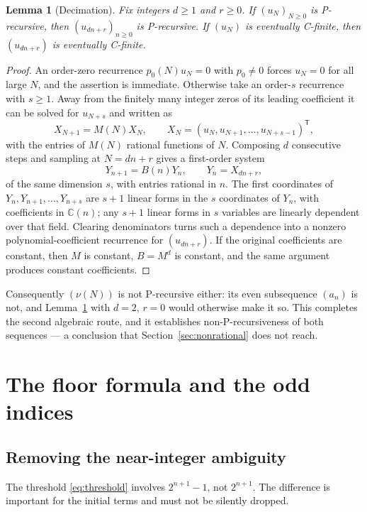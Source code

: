\documentclass[11pt,letterpaper]{article}
\numberwithin{equation}{section}
\newtheorem{lemma}[theorem]{Lemma}
\theoremstyle{definition}
\theoremstyle{remark}
\newcommand{\C}{\mathbb{C}}
\begin{document}
\begin{lemma}[Decimation]\label{lem:decimation}
Fix integers $d\ge1$ and $r\ge0$. If $(u_N)_{N\ge0}$ is P-recursive, then
$(u_{dn+r})_{n\ge0}$ is P-recursive. If $(u_N)$ is eventually C-finite, then
$(u_{dn+r})$ is eventually C-finite.
\end{lemma}
\begin{proof}
An order-zero recurrence $p_0(N)u_N=0$ with $p_0\ne0$ forces $u_N=0$ for all
large $N$, and the assertion is immediate. Otherwise take an order-$s$
recurrence with $s\ge1$. Away from the finitely many integer zeros of its
leading coefficient it can be solved for $u_{N+s}$ and written as
\[
 X_{N+1}=M(N)X_N,\qquad
 X_N=(u_N,u_{N+1},\ldots,u_{N+s-1})^{\mathsf T},
\]
with the entries of $M(N)$ rational functions of $N$. Composing $d$
consecutive steps and sampling at $N=dn+r$ gives a first-order system
\[
 Y_{n+1}=B(n)Y_n,\qquad Y_n=X_{dn+r},
\]
of the same dimension $s$, with entries rational in $n$. The first
coordinates of $Y_n,Y_{n+1},\ldots,Y_{n+s}$ are $s+1$ linear forms in the
$s$ coordinates of $Y_n$, with coefficients in $\C(n)$; any $s+1$ linear
forms in $s$ variables are linearly dependent over that field. Clearing
denominators turns such a dependence into a nonzero
polynomial-coefficient recurrence for $(u_{dn+r})$. If the original
coefficients are constant, then $M$ is constant, $B=M^d$ is constant, and
the same argument produces constant coefficients.
\end{proof}

Consequently $(\nu(N))$ is not P-recursive either: its even subsequence
$(a_n)$ is not, and Lemma~\ref{lem:decimation} with $d=2$, $r=0$ would
otherwise make it so. This completes the second algebraic route, and it
establishes non-P-recursiveness of both sequences --- a conclusion that
Section~\ref{sec:nonrational} does not reach.

\section{The floor formula and the odd indices}\label{sec:floor}

\subsection{Removing the near-integer ambiguity}
The threshold \eqref{eq:threshold} involves $2^{n+1}-1$, not $2^{n+1}$.
The difference is important for the initial terms and must not be silently
dropped.
\end{document}
